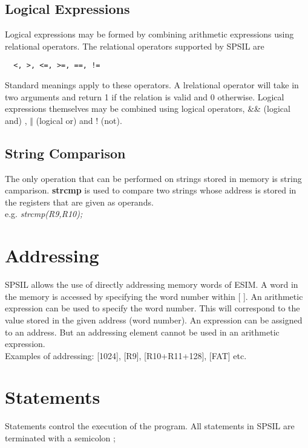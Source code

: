 \documentclass[11pt]{article}
\begin{document}
\subsection{Logical Expressions}

Logical expressions may be formed by combining arithmetic expressions using relational operators. The relational operators supported by SPSIL are \begin{verbatim}  <, >, <=, >=, ==, !=
\end{verbatim}
Standard  meanings apply to these operators. A lrelational operator will take in two arguments and return 1 if the relation is valid and 0 otherwise. Logical expressions themselves may be combined using logical operators, \&\& (logical and) ,  $\Vert$ (logical or) and ! (not).

\subsection{String Comparison}
The only operation that can be performed on strings stored in memory is string camparison. \textbf{strcmp} is used to compare two strings whose address is stored in the registers that are given as operands. \\

 e.g. \textit{strcmp(R9,R10);}


\section{Addressing}
SPSIL allows the use of directly addressing memory words of ESIM. A word in the memory is accessed by specifying the word number within [ ]. An arithmetic expression can be used to specify the word number. This will correspond to the value stored in the given address (word number). An expression can be assigned to an address. But an addressing element cannot be used in an arithmetic expression. \\

Examples of addressing: [1024], [R9], [R10+R11+128], [FAT] etc.

\section{Statements}

Statements control the execution of the program. All statements in SPSIL are terminated with a semicolon ;
\end{document}
